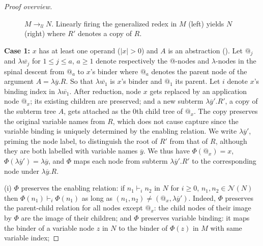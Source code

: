 \documentclass[xchauthor,chkrefs,GCNS,amsmath,amsthm,rotating,leaveRGB]{tcsg}
\theoremstyle{plain}
\theoremstyle{definition}
\newcommand{\Nodes}{\mathcal{N}}
\newcommand{\enables}{\vdash}
\newcommand{\llred}{\rightarrow_{ll}}
\begin{document}
\begin{proof}[Proof overview]
\begin{figure}
\begin{sgmlfig}
\end{sgmlfig}
\caption{$M\llred N$. Linearly firing the generalized redex in $M$ (left) yields
$N$ (right) where $R'$ denotes a copy of $R$.}\label{fig3}
\end{figure}

\textbf{Case 1:} $x$ has at least one operand ($|x|>0$) and $A$ is an
abstraction (). Let $@_{j}$ and $\lambda \overline{w_{j}}$ for $1\leq j\leq a$,
$a\geq 1$ denote respectively the @-nodes and $\lambda $-nodes in the spinal
descent from $@_{a}$ to $x$'s binder where $@_{a}$ denotes the parent node of
the argument $A = \lambda \overline{y}. R$. So that $\lambda
\overline{w_{1}}$ is $x$'s binder and $@_{1}$ its parent. Let $i$ denote
$x$'s binding index in $\lambda \overline{w_{1}}$. After reduction, node $x$
gets replaced by an application node $@_{x}$; its existing children are
preserved; and a new subterm $\lambda \overline{y}'. R'$, a copy of the
subterm tree $A$, gets attached as the $0$th child tree of $@_{x}$. The copy
preserves the original variable names from $R$, which does not cause capture
since the variable binding is uniquely determined by the enabling relation.
We write $\lambda \overline{y}'$, priming the node label, to distinguish the
root of $R'$ from that of $R$, although they are both labelled with variable
names $\overline{y}$. We thus have $\Phi (@_{x}) = x$, $\Phi (\lambda
\overline{y}') = \lambda \overline{y}$, and $\Phi $ maps each node from
subterm $\lambda \overline{y}'. R'$  to the corresponding node under $\lambda
\overline{y}.R$.


(i) $\Phi $ preserves the enabling relation: if $n_{1} \enables _{i} n_{2}$
in $N$ for $i\geq 0$, $n_{1},n_{2} \in \Nodes (N)$ then $\Phi (n_{1})
\enables _{i} \Phi (n_{1})$ as long as $(n_{1},n_{2}) \neq (@_{x},\lambda
\overline{y}')$. Indeed, $\Phi $ preserves the parent-child relation for all
nodes except $@_{x}$: the child nodes of their image by $\Phi $ are the image
of their children; and $\Phi $ preserves variable binding: it maps the binder
of a variable node $z$ in $N$ to the binder of $\Phi (z)$ in $M$ with same
variable index;


\end{proof}
\end{document}
